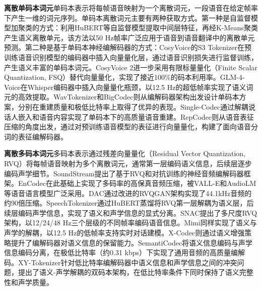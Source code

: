 \textbf{离散单码本词元}\quad 单码本表示将每帧语音映射为一个离散词元，一段语音在给定帧率下产生一维的词元序列。单码本离散词元主要有两种获取方式。第一种是自监督模型加聚类的方式：利用HuBERT等自监督模型提取中间层特征，再经K-Means聚类产生语义离散单元，该方法以50 Hz帧率广泛应用于语音到语音翻译中的离散单元预测。第二种是基于单码本神经编解码器的方式：CosyVoice\citep{du2024cosyvoice}的S3 Tokenizer在预训练语音识别模型的编码器中插入向量量化层，通过语音识别损失进行监督训练，产生语义丰富的单码本词元。CosyVoice 2\citep{du2024cosyvoice2}进一步采用有限标量量化（Finite Scalar Quantization, FSQ）替代向量量化，实现了接近100\%的码本利用率。GLM-4-Voice\citep{glm4voice}在Whisper编码器中插入向量量化瓶颈，以12.5 Hz的超低帧率实现了语义词元的高效提取。WavTokenizer\citep{ji2024wavtokenizer}和BigCodec\citep{xin2024bigcodec}则从编解码器架构出发设计单码本方案，分别在重建质量和极低比特率上取得了优异的表现。Single-Codec\citep{li2024singlecodec}通过解耦说话人嵌入和语音内容实现了单码本下的高质量语音重建。RepCodec\citep{huang2023repcodec}则从语音表征压缩的角度出发，通过对预训练语音模型的表征进行向量量化，构建了面向语音分词的表征编解码器。

\textbf{离散多码本词元}\quad 多码本表示通过残差向量量化（Residual Vector Quantization, RVQ）将每帧语音映射为多个离散词元，通常第一层编码语义信息，后续层逐步编码声学细节。SoundStream\citep{zeghidour2021soundstream}提出了基于RVQ和对抗训练的神经音频编解码器框架。EnCodec\citep{defossez2022encodec}在此基础上实现了多码率的高保真音频压缩，被VALL-E\citep{wang-etal-2023-valle}和AudioLM\citep{borsos2023audiolm}等语音语言模型广泛采用。DAC\citep{kumar2023dac}通过改进的RVQGAN架构实现了44.1kHz音频的约90倍压缩。SpeechTokenizer\citep{zhang2024speechtokenizer}通过HuBERT蒸馏将RVQ第一层解耦为语义层，后续层编码声学信息，实现了语义和声学信息的显式分离。SNAC\citep{siuzdak2024snac}提出了多尺度RVQ架构，以12/24/48 Hz三个层级的不同帧率编码语音信息。Mimi\citep{kyutai2024moshi}同样实现了语义与声学的解耦，以12.5 Hz的低帧率支持实时对话建模。X-Codec\citep{ye2024xcodec}则通过语义增强策略提升了编解码器对语义信息的保留能力。SemantiCodec\citep{liu2024semanticodec}将语义信息编码与声学信息编码分离，在极低比特率（约0.31 kbps）下实现了通用音频的高质量编解码。XY-Tokenizer\citep{xiao2025xytokenizer}针对低比特率编解码器中语义信息和声学信息之间的冲突问题，提出了语义-声学解耦的双码本架构，在低比特率条件下同时保持了语义完整性和声学质量。


